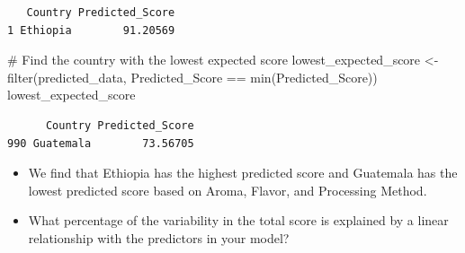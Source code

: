 \documentclass[
  letterpaper,
  DIV=11,
  numbers=noendperiod]{scrreprt}
\newenvironment{Shaded}{\begin{snugshade}}{\end{snugshade}}
\newcommand{\AttributeTok}[1]{\textcolor[rgb]{0.40,0.45,0.13}{#1}}
\newcommand{\CommentTok}[1]{\textcolor[rgb]{0.37,0.37,0.37}{#1}}
\newcommand{\DocumentationTok}[1]{\textcolor[rgb]{0.37,0.37,0.37}{\textit{#1}}}
\newcommand{\FunctionTok}[1]{\textcolor[rgb]{0.28,0.35,0.67}{#1}}
\newcommand{\NormalTok}[1]{\textcolor[rgb]{0.00,0.23,0.31}{#1}}
\newcommand{\OtherTok}[1]{\textcolor[rgb]{0.00,0.23,0.31}{#1}}
\newcommand{\SpecialCharTok}[1]{\textcolor[rgb]{0.37,0.37,0.37}{#1}}
\begin{document}
\begin{Shaded}
\end{Shaded}

\begin{verbatim}
   Country Predicted_Score
1 Ethiopia        91.20569
\end{verbatim}

\begin{Shaded}
\begin{Highlighting}[]
\CommentTok{\# Find the country with the lowest expected score}
\NormalTok{lowest\_expected\_score }\OtherTok{\textless{}{-}} \FunctionTok{filter}\NormalTok{(predicted\_data, Predicted\_Score }\SpecialCharTok{==} \FunctionTok{min}\NormalTok{(Predicted\_Score))}
\NormalTok{lowest\_expected\_score}
\end{Highlighting}
\end{Shaded}

\begin{verbatim}
      Country Predicted_Score
990 Guatemala        73.56705
\end{verbatim}

\begin{itemize}
\item
  We find that Ethiopia has the highest predicted score and Guatemala
  has the lowest predicted score based on Aroma, Flavor, and Processing
  Method.
\item
  What percentage of the variability in the total score is explained by
  a linear relationship with the predictors in your model?
\end{itemize}
\end{document}
